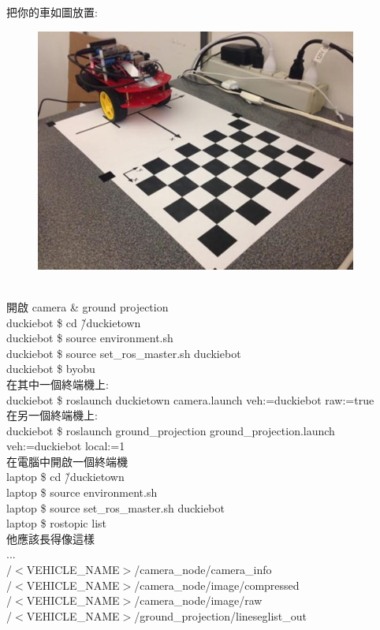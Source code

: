 \documentclass{article}
\begin{document}
把你的車如圖放置:
\\
\begin{figure}[htp]
    \begin{center}
        \includegraphics[width=300pt]{pic/圖片16.jpg}
    \end{center}
\end{figure}
\\
開啟 camera \& ground projection
\\duckiebot \$ cd \~/duckietown
\\duckiebot \$ source environment.sh
\\duckiebot \$ source set\_ros\_master.sh duckiebot
\\duckiebot \$ byobu
\\在其中一個終端機上:
\\duckiebot \$ roslaunch duckietown camera.launch veh:=duckiebot raw:=true
\\在另一個終端機上:
\\duckiebot \$ roslaunch ground\_projection ground\_projection.launch  veh:=duckiebot local:=1
\\在電腦中開啟一個終端機
\\laptop \$ cd \~/duckietown
\\laptop \$ source environment.sh
\\laptop \$ source set\_ros\_master.sh duckiebot
\\laptop \$ rostopic list
\\他應該長得像這樣
\\...
\\/$<$VEHICLE\_NAME$>$/camera\_node/camera\_info
\\/$<$VEHICLE\_NAME$>$/camera\_node/image/compressed
\\/$<$VEHICLE\_NAME$>$/camera\_node/image/raw
\\/$<$VEHICLE\_NAME$>$/ground\_projection/lineseglist\_out
\end{document}
